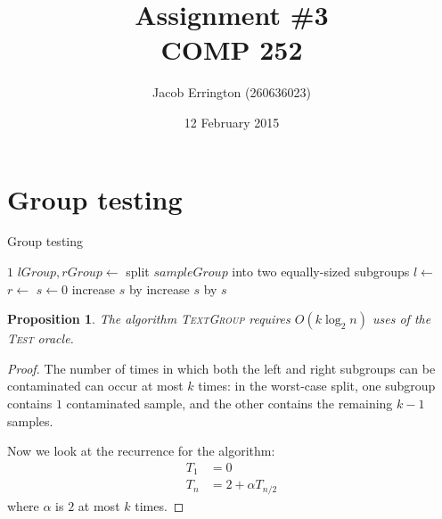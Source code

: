 \documentclass{article}
\author{Jacob Errington (260636023)}
\date{12 February 2015}
\title{Assignment \#3\\COMP 252}
\newtheorem{proposition}{Proposition}
\begin{document}
\maketitle

\section{Group testing}

\begin{algorithm}
    \caption{Group testing}
    \begin{algorithmic}
                \Return $1$
            \EndIf
            \State $lGroup, rGroup \gets$ split $sampleGroup$ into two equally-sized subgroups
            \State $l \gets$ 
            \State $r \gets$ 
            \State $s \gets 0$
                \State increase $s$ by 
            \EndIf
                \State increase $s$ by 
            \EndIf
            \State \Return $s$
        \EndFunction
    \end{algorithmic}
\end{algorithm}

\begin{proposition}
    The algorithm \textsc{TextGroup} requires $O(k\log_2{n})$ uses of the \textsc{Test} oracle.
\end{proposition}

\begin{proof}
    The number of times in which both the left and right subgroups can be
    contaminated can occur at most $k$ times: in the worst-case split, one
    subgroup contains $1$ contaminated sample, and the other contains the
    remaining $k-1$ samples.

    Now we look at the recurrence for the algorithm:
    \begin{align*}
        T_1   &= 0 \\
        T_{n} &= 2 + \alpha T_{n/2}
    \end{align*}
    where $\alpha$ is $2$ at most $k$ times.
\end{proof}
\end{document}
